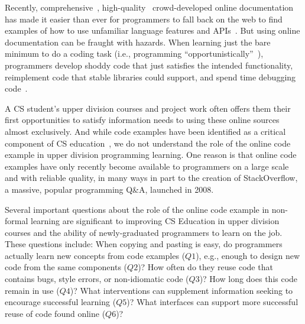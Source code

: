 \documentclass[12pt]{memoir}
\title{}
\author{Andrew Head}
\begin{document}




Recently, comprehensive~\cite{parnin_crowd_2012}, high-quality~\cite{mamykina_design_2011} crowd-developed online documentation has made it easier than ever for programmers to fall back on the web to find examples of how to use unfamiliar language features and APIs~\cite{brandt_two_2009}.
But using online documentation can be fraught with hazards.
When learning just the bare minimum to do a coding task (i.e., programming ``opportunistically''~\cite{clarke_what_2007}), programmers develop shoddy code that just satisfies the intended functionality, reimplement code that stable libraries could support, and spend time debugging code~\cite{brandt_opportunistic_2008,brandt_two_2009}.

A CS student's upper division courses and project work often offers them their first opportunities to satisfy information needs to using these online sources almost exclusively.
And while code examples have been identified as a critical component of CS education~\cite{lahtinen_study_2005}, we do not understand the role of the online code example in upper division programming learning.
One reason is that online code examples have only recently become available to programmers on a large scale and with reliable quality, in many ways in part to the creation of StackOverflow, a massive, popular programming Q\&A, launched in 2008.

Several important questions about the role of the online code example in non-formal learning are significant to improving CS Education in upper division courses and the ability of newly-graduated programmers to learn on the job.
These questions include:
When copying and pasting is easy, do programmers actually learn new concepts from code examples ($Q1$), e.g., enough to design new code from the same components ($Q2$)?
How often do they reuse code that contains bugs, style errors, or non-idiomatic code ($Q3$)?
How long does this code remain in use ($Q4$)?
What interventions can supplement information seeking to encourage successful learning ($Q5$)?
What interfaces can support more successful reuse of code found online ($Q6$)?
\end{document}
